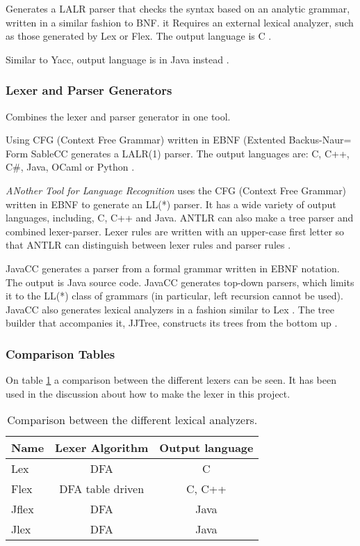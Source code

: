Generates a LALR parser that checks the syntax based on an analytic grammar, written in a similar fashion to BNF. it Requires an external lexical analyzer, such as those generated by Lex or Flex. The output language is C \citep{Yacc}.

Similar to Yacc, output language is in Java instead \citep{CUP}.

\subsubsection{Lexer and Parser Generators}
Combines the lexer and parser generator in one tool.

Using CFG (Context Free Grammar) written in EBNF (Extented Backus-Naur= Form SableCC generates a LALR(1) parser. The output languages are: C, C++, C\#, Java, OCaml or Python \citep{SableCC}.

\textit{ANother Tool for Language Recognition} uses the CFG (Context Free Grammar) written in EBNF to generate an LL(*) parser. It has a wide variety of output languages, including, C, C++ and Java.
ANTLR can also make a tree parser and combined lexer-parser. Lexer rules are written with an upper-case first letter so that ANTLR can distinguish between lexer rules and parser rules \citep{ANTLRLexer}. 

JavaCC generates a parser from a formal grammar written in EBNF notation. The output is Java source code. JavaCC generates top-down parsers, which limits it to the LL(*) class of grammars (in particular, left recursion cannot be used). JavaCC also generates lexical analyzers in a fashion similar to Lex \citep{Javacc}. The tree builder that accompanies it, JJTree, constructs its trees from the bottom up \citep{JJTree}.

\subsubsection{Comparison Tables}
On table \ref{tab:ComparisonLexer} a comparison between the different lexers can be seen. It has been used in the discussion about how to make the lexer in this project.
\begin{table}[H]
\begin{tabular}{|l|c|c|}
\hline
\textbf{Name}	& \textbf{Lexer Algorithm}	& \textbf{Output language}	\\ \hline
Lex				& DFA						& C							\\ \hline
Flex			& DFA table driven			& C, C++					\\ \hline
Jflex			& DFA						& Java						\\ \hline
Jlex			& DFA						& Java						\\ \hline
\end{tabular}
\caption{Comparison between the different lexical analyzers.}
\label{tab:ComparisonLexer}
\end{table}


